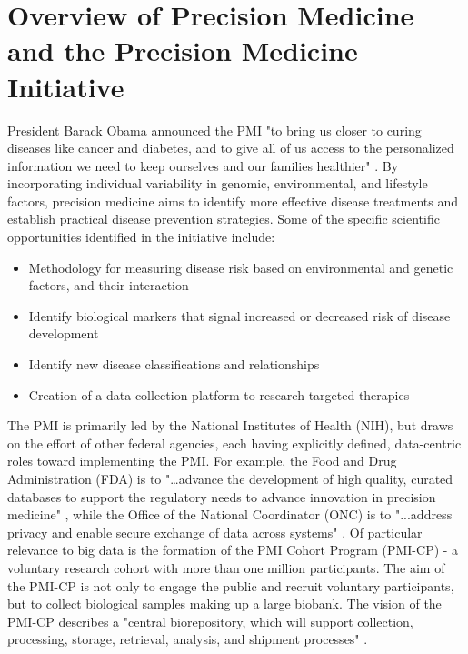 \section{Overview of Precision Medicine and the Precision Medicine Initiative}

President Barack Obama announced the PMI "to bring us closer to curing diseases like cancer and diabetes, and to give all of us access to the personalized information we need to keep ourselves and our families healthier" \cite{obamaVid} \cite{Terry2015}. By incorporating individual variability in genomic, environmental, and lifestyle factors, precision medicine aims to identify more effective disease treatments and establish practical disease prevention strategies. Some of the specific scientific opportunities identified in the initiative include:

\begin{itemize}
  \setlength{\parskip}{1em}\item Methodology for measuring disease risk based on environmental and genetic factors, and their interaction
  \setlength{\parskip}{1em}\item Identify biological markers that signal increased or decreased risk of disease development
  \setlength{\parskip}{1em}\item Identify new disease classifications and relationships
  \setlength{\parskip}{1em}\item Creation of a data collection platform to research targeted therapies
\end{itemize}

The PMI is primarily led by the National Institutes of Health (NIH), but draws on the effort of other federal agencies, each having explicitly defined, data-centric roles toward implementing the PMI. For example, the Food and Drug Administration (FDA) is to "…advance the development of high quality, curated databases to support the regulatory needs to advance innovation in precision medicine" \cite{Hudson2015}, while the Office of the National Coordinator (ONC) is to "...address privacy and enable secure exchange of data across systems" \cite{Hudson2015}. Of particular relevance to big data is the formation of the PMI Cohort Program (PMI-CP) - a voluntary research cohort with more than one million participants. The aim of the PMI-CP is not only to engage the public and recruit voluntary participants, but to collect biological samples making up a large biobank. The vision of the PMI-CP describes a "central biorepository, which will support collection, processing, storage, retrieval, analysis, and shipment processes" \cite{Hudson2015}.

